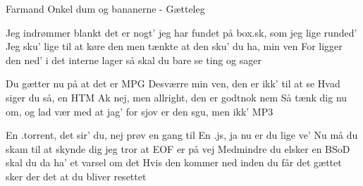 {Farmand}
{Onkel dum og bananerne - Gætteleg}
{

Jeg indrømmer blankt det er nogt' jeg har fundet
på box.sk, som jeg lige runded'
Jeg sku' lige til at køre den
men tænkte at den sku' du ha, min ven
For ligger den ned' i det interne lager
så skal du bare se ting og sager


Du gætter nu på at det er MPG
Desværre min ven, den er ikk' til at se
Hvad siger du så, en HTM
Ak nej, men allright, den er godtnok nem
Så tænk dig nu om, og lad vær med at jag'
for sjov er den sgu, men ikk' MP3


En .torrent, det sir' du, nej prøv en gang til
En .js, ja nu er du lige ve'
Nu må du skam til at skynde dig
jeg tror at EOF er på vej
Medmindre du elsker en BSoD
skal du da ha' et varsel om det
Hvis den kommer ned inden du får det gættet
sker der det at du bliver resettet


}


